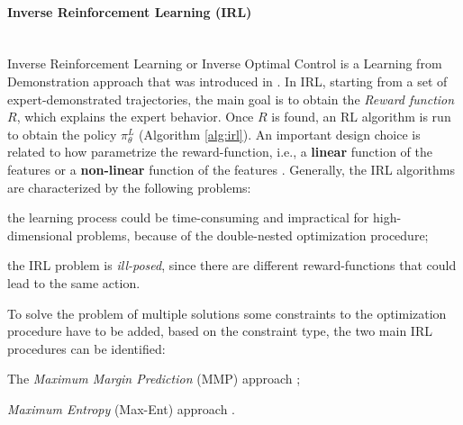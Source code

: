 \paragraph{Inverse Reinforcement Learning (IRL)}  \mbox{} \\
Inverse Reinforcement Learning or Inverse Optimal Control is a Learning from Demonstration approach that was introduced in \cite{abbeel2004apprenticeship}. In IRL, starting from a set of expert-demonstrated trajectories, the main goal is to obtain the \textit{Reward function} $R$, which explains the expert behavior. Once $R$ is found, an RL algorithm is run to obtain the policy $\pi^{L}_{\theta}$ (Algorithm \ref{alg:irl}). %
An important design choice is related to how parametrize the reward-function, i.e., a \textbf{linear} function of the features \cite{ratliff2006maximum_margin,ziebart2008maximum_entropy} or  a \textbf{non-linear} function of the features \cite{ratliff2009learning_to_search,wulfmeier2015deep_inverse_rl,finn2016guided_cost_learning}.
Generally, the IRL algorithms are characterized by the following problems: \begin{enumerate*}[label=\textbf{(\arabic*)}]
    \item the learning process could be time-consuming and impractical for high-dimensional problems, because of the double-nested optimization procedure;
    \item the IRL problem is \textit{ill-posed}, since there are different reward-functions that could lead to the same action.
\end{enumerate*}
%
\newline To solve the problem of multiple solutions some constraints to the optimization procedure have to be added, based on the constraint type, the two main IRL procedures can be identified: \begin{enumerate*}[label=\textbf{(\alph*)}]
    \item The \textit{Maximum Margin Prediction} (MMP) approach \cite{ratliff2006maximum_margin,ratliff2009learning_to_search};
    \item \textit{Maximum Entropy} (Max-Ent) approach \cite{ziebart2008maximum_entropy,wulfmeier2015deep_inverse_rl,finn2016guided_cost_learning}.
\end{enumerate*}
